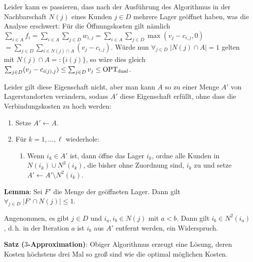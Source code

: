 Leider kann es passieren, dass nach der Ausführung des Algorithmus
in der Nachbarschaft $N(j)$ eines Kunden $j \in D$ mehrere Lager geöffnet haben,
was die Analyse erschwert:
Für die Öffnungskosten gilt nämlich
$\sum_{i \in A} f_i
= \sum_{i \in A} \sum_{j \in D} w_{i,j}
= \sum_{i \in A} \sum_{j \in D} \max(v_j - c_{i,j}, 0)$\\
$= \sum_{j \in D} \sum_{i \in N(j) \cap A} (v_j - c_{i,j})$.
Würde nun $\forall_{j \in D}\; |N(j) \cap A| = 1$ gelten mit $N(j) \cap A =: \{i(j)\}$,
so wäre dies gleich
$\sum_{j \in D} (v_j - c_{i(j),j})
\le \sum_{j \in D} v_j \le \text{OPT}_\text{dual}$.

Leider gilt diese Eigenschaft nicht,
aber man kann $A$ so zu einer Menge $A'$ von Lagerstandorten verändern,
sodass $A'$ diese Eigenschaft erfüllt, ohne dass die Verbindungskosten zu hoch werden:
\begin{enumerate}[start=3]
    \item
    Setze $A' \leftarrow A$.

    \item
    Für $k = 1, \dotsc, \ell$ wiederhole:
    \begin{enumerate}
        \item
        Wenn $i_k \in A'$ ist,
        dann öffne das Lager $i_k$,
        ordne alle Kunden in $N(i_k) \cup N^3(i_k)$, die bisher ohne Zuordnung sind, $i_k$ zu
        und setze $A' \leftarrow A' \setminus N^2(i_k)$.
    \end{enumerate}
\end{enumerate}

\linie

\textbf{Lemma}:
Sei $F'$ die Menge der geöffneten Lager.
Dann gilt $\forall_{j \in D}\; |F' \cap N(j)| \le 1$.

\begin{Beweis}
    Angenommen, es gibt $j \in D$ und $i_a, i_b \in N(j)$ mit $a < b$.
    Dann gilt $i_b \in N^2(i_a)$, d.\,h. in der Iteration $a$ ist $i_b$ aus $A'$
    entfernt werden, ein Widerspruch.
\end{Beweis}

\textbf{Satz ($3$-Approximation)}:
Obiger Algorithmus erzeugt eine Lösung, deren Kosten höchstens drei Mal so groß sind
wie die optimal möglichen Kosten.


